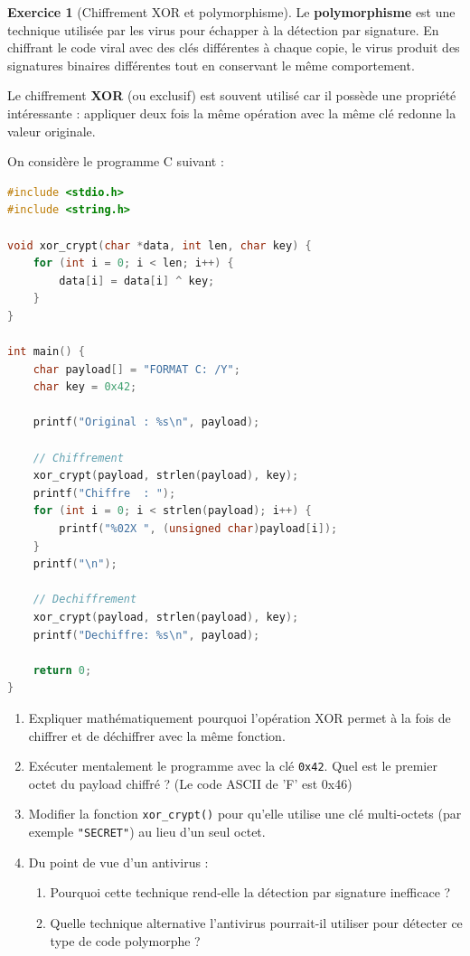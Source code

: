 \documentclass[a4paper,11pt]{article}
\theoremstyle{plain}
\theoremstyle{definition}
\newtheorem{exercice}{Exercice}
\begin{document}
\begin{exercice}[Chiffrement XOR et polymorphisme]

Le \textbf{polymorphisme} est une technique utilisée par les virus pour échapper à la détection par signature. En chiffrant le code viral avec des clés différentes à chaque copie, le virus produit des signatures binaires différentes tout en conservant le même comportement.

Le chiffrement \textbf{XOR} (ou exclusif) est souvent utilisé car il possède une propriété intéressante : appliquer deux fois la même opération avec la même clé redonne la valeur originale.

On considère le programme C suivant :

\begin{lstlisting}[language=C]
#include <stdio.h>
#include <string.h>

void xor_crypt(char *data, int len, char key) {
    for (int i = 0; i < len; i++) {
        data[i] = data[i] ^ key;
    }
}

int main() {
    char payload[] = "FORMAT C: /Y";
    char key = 0x42;

    printf("Original : %s\n", payload);

    // Chiffrement
    xor_crypt(payload, strlen(payload), key);
    printf("Chiffre  : ");
    for (int i = 0; i < strlen(payload); i++) {
        printf("%02X ", (unsigned char)payload[i]);
    }
    printf("\n");

    // Dechiffrement
    xor_crypt(payload, strlen(payload), key);
    printf("Dechiffre: %s\n", payload);

    return 0;
}
\end{lstlisting}

\begin{enumerate}
\item Expliquer mathématiquement pourquoi l'opération XOR permet à la fois de chiffrer et de déchiffrer avec la même fonction.

\item Exécuter mentalement le programme avec la clé \texttt{0x42}. Quel est le premier octet du payload chiffré ? (Le code ASCII de 'F' est 0x46)

\item Modifier la fonction \texttt{xor\_crypt()} pour qu'elle utilise une clé multi-octets (par exemple \texttt{"SECRET"}) au lieu d'un seul octet.

\item Du point de vue d'un antivirus :
\begin{enumerate}
\item Pourquoi cette technique rend-elle la détection par signature inefficace ?
\item Quelle technique alternative l'antivirus pourrait-il utiliser pour détecter ce type de code polymorphe ?
\end{enumerate}
\end{enumerate}

\end{exercice}
\end{document}
